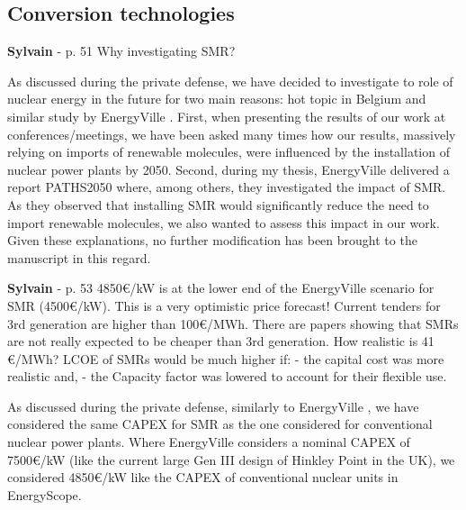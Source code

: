 \documentclass[12pt,a4paper]{article}
\begin{document}
\subsection{Conversion technologies}
\label{methodo_technologies}

\begin{mdframed}[style=comment] %
{\color{purple} \textbf{Sylvain}} - p. 51 Why investigating SMR?
\end{mdframed}

\noindent As discussed during the private defense, we have decided to investigate to role of nuclear energy in the future for two main reasons: hot topic in Belgium and similar study by EnergyVille \cite{PATHS2050}. First, when presenting the results of our work at conferences/meetings, we have been asked many times how our results, massively relying on imports of renewable molecules, were influenced by the installation of nuclear power plants by 2050. Second, during my thesis, EnergyVille delivered a report PATHS2050 where, among others, they investigated the impact of SMR. As they observed that installing SMR would significantly reduce the need to import renewable molecules, we also wanted to assess this impact in our work. Given these explanations, no further modification has been brought to the manuscript in this regard.

\begin{mdframed}[style=comment] %
{\color{purple} \textbf{Sylvain}} - p. 53 4850€/kW is at the lower end of the EnergyVille scenario for SMR (4500€/kW). This is a very optimistic price forecast! Current tenders for 3rd generation are higher than 100€/MWh. There are papers showing that SMRs are not really expected to be cheaper than 3rd generation. How realistic is 41 €/MWh? LCOE of SMRs would be much higher if: - the capital cost was more realistic and, - the Capacity factor was lowered to account for their flexible use.
\end{mdframed}

\noindent As discussed during the private defense, similarly to EnergyVille \cite{PATHS2050}, we have considered the same CAPEX for SMR as the one considered for conventional nuclear power plants. Where EnergyVille considers a nominal CAPEX of 7500€/kW (like the current large Gen III design of Hinkley Point in the UK), we considered 4850€/kW like the CAPEX of conventional nuclear units in EnergyScope. 
\end{document}
